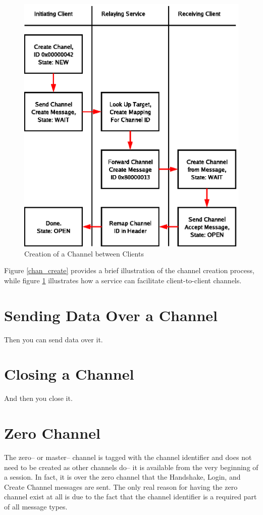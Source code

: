 \begin{figure}[!h]
  \begin{center}
    \includegraphics{diagrams/chan_create_proxy.eps}
  \end{center}
  \caption{Creation of a Channel between Clients}
  \label{chan_create_proxy}
\end{figure}

\par{} Figure \ref{chan_create} provides a brief illustration of the
channel creation process, while figure \ref{chan_create_proxy}
illustrates how a service can facilitate client-to-client channels.


\section{Sending Data Over a Channel}
\par{} Then you can send data over it.


\section{Closing a Channel}
\par{} And then you close it.


\section{Zero Channel}
\par{} The zero-- or master-- channel is tagged with the channel
identifier  and does not need to be created as other
channels do-- it is available from the very beginning of a session. In
fact, it is over the zero channel that the Handshake, Login, and
Create Channel messages are sent. The only real reason for having the
zero channel exist at all is due to the fact that the channel
identifier is a required part of all message types.
